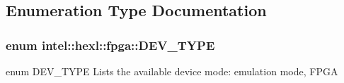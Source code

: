\subsection{Enumeration Type Documentation}
\hypertarget{namespaceintel_1_1hexl_1_1fpga_a1a264f07facc5f24376170ea052e4fbc}{
\subsubsection[{D\-E\-V\-\_\-\-T\-Y\-P\-E}]{\setlength{\rightskip}{0pt plus 5cm}enum {\bf intel\-::hexl\-::fpga\-::\-D\-E\-V\-\_\-\-T\-Y\-P\-E}}}\label{namespaceintel_1_1hexl_1_1fpga_a1a264f07facc5f24376170ea052e4fbc}


enum D\-E\-V\-\_\-\-T\-Y\-P\-E Lists the available device mode\-: emulation mode, F\-P\-G\-A 

